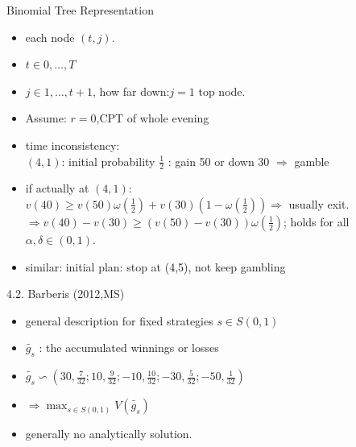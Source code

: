 \documentclass[11pt,aspectratio=169]{beamer}
\begin{document}
\begin{frame}{Binomial Tree Representation}
    \begin{itemize}
        \item each node $(t,j)$.  \medskip
        \item $t \in {0,\ldots ,T}$ \medskip
        \item $ j \in {1,\ldots,t+1}$, how far down:$j=1$ top node.\medskip
        \item Assume: $r=0$,CPT of whole evening
        \item  time inconsistency:\\
        $(4,1)$: initial probability $\frac{1}{2}$ : gain 50 or down 30  $\Rightarrow$ gamble\\
        \item if actually at $(4,1)$:\\
        $v(40) \geq v(50)\omega (\frac{1}{2})+v(30)(1-\omega (\frac{1}{2})) \Rightarrow$ usually exit. \\
        $\Rightarrow v(40)-v(30) \geq (v(50)-v(30))\omega (\frac{1}{2})   $;  holds for all $\alpha, \delta \in (0,1)$.\\
        \item similar: initial plan: stop at (4,5), not keep gambling\\
    \end{itemize}
\end{frame}

\begin{frame}{4.2. Barberis (2012,MS)}
    \begin{itemize}
        \item general description for fixed strategies $s \in S(0,1)$\\
        \item $\tilde{g_s} $ : the accumulated winnings or losses\\
        \item $\tilde{g_s} \backsim (30,\frac{7}{32};10,\frac{9}{32};-10,\frac{10}{32};-30,\frac{5}{32};-50,\frac{1}{32} )  $\\
        \item $\Rightarrow \max_{s \in S(0,1)} V(\tilde{g_s})$\\
        \item generally no analytically solution.\\
    \end{itemize}
\end{frame}
\end{document}
